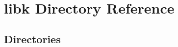 \section{libk Directory Reference}
\label{dir_373dbc578909e855ad4333204b592304}
\subsection*{Directories}
\begin{DoxyCompactItemize}
\end{DoxyCompactItemize}
